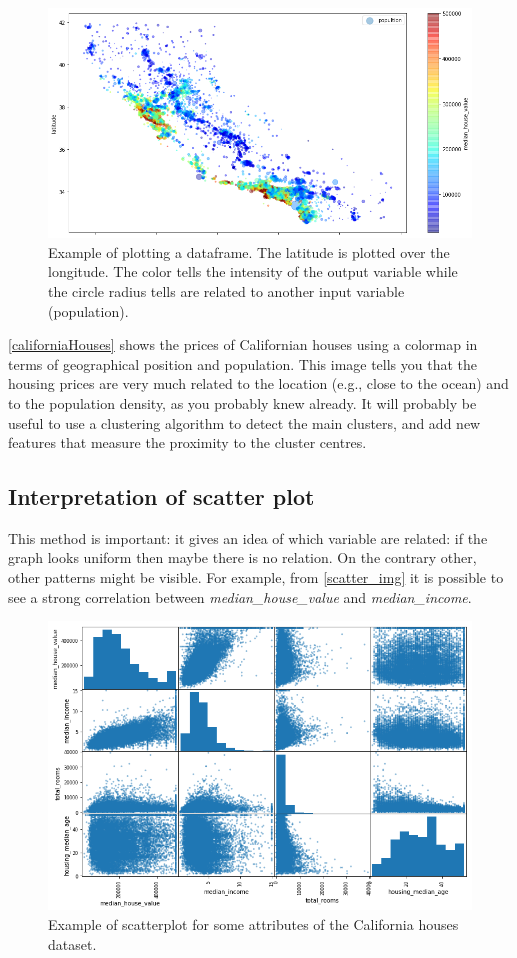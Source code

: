 \documentclass[12pt, letterpaper]{article}
\theoremstyle{definition}
\let\ti\textit
\begin{document}
\begin{figure}
\centering
\includegraphics[scale=0.45]{img/DatasetCmap}
\caption{Example of plotting a dataframe. The latitude is plotted over the longitude. The color tells the intensity of the output variable while the circle radius tells are related to another input variable (population).}
\label{californiaHouses}
\end{figure}

\autoref{californiaHouses} shows the prices of Californian houses using a colormap in terms of geographical position and population.
This image tells you that the housing prices are very much related to the location (e.g., close to the ocean) and to the population density, as you probably knew already. It will probably be useful to use a clustering algorithm to detect the main clusters, and add new features that measure the proximity to the cluster centres. 

\subsection{Interpretation of scatter plot}
\label{scatterplot}
This method is important: it gives an idea of which variable are related: if the graph looks uniform then maybe there is no relation. On the contrary other, other patterns might be visible. For example, from \autoref{scatter_img} it is possible to see a strong correlation between \ti{median\_house\_value} and \ti{median\_income}.
\begin{figure}
\centering
\includegraphics[scale=0.51]{img/scatterplot}
\caption{Example of scatterplot for some attributes of the California houses dataset.}
\label{scatter_img}
\end{figure}
\end{document}

